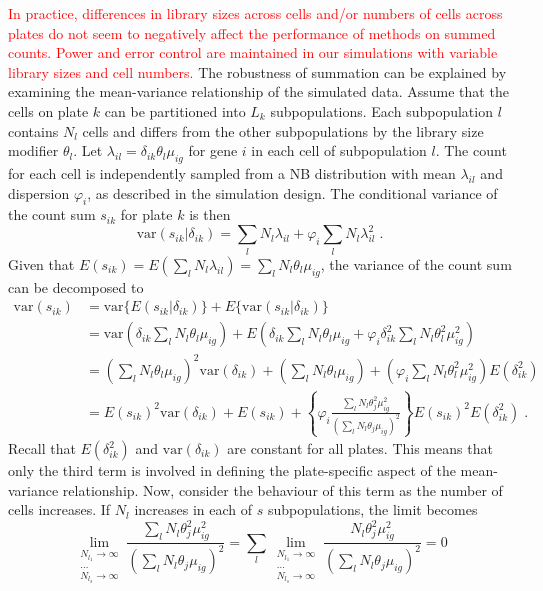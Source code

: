 \documentclass{article}
\newcommand\revised[1]{\textcolor{red}{#1}}
\begin{document}
\revised{In practice, differences in library sizes across cells and/or numbers of cells across plates do not seem to negatively affect the performance of methods on summed counts.
Power and error control are maintained in our simulations with variable library sizes and cell numbers.}
The robustness of summation can be explained by examining the mean-variance relationship of the simulated data.
Assume that the cells on plate $k$ can be partitioned into $L_k$ subpopulations.
Each subpopulation $l$ contains $N_l$ cells and differs from the other subpopulations by the library size modifier $\theta_l$.
Let $\lambda_{il} = \delta_{ik}\theta_{l}\mu_{ig}$ for gene $i$ in each cell of subpopulation $l$.
The count for each cell is independently sampled from a NB distribution with mean $\lambda_{il}$ and dispersion $\varphi_i$, as described in the simulation design.
The conditional variance of the count sum $s_{ik}$ for plate $k$ is then
\[
    \mbox{var}(s_{ik} | \delta_{ik}) = \sum_{l} N_l \lambda_{il}  + \varphi_{i} \sum_{l} N_l \lambda_{il}^2 \;.
\]
Given that $E(s_{ik}) = E(\sum_l N_l\lambda_{il}) = \sum_l N_l \theta_l \mu_{ig}$, the variance of the count sum can be decomposed to
\begin{align*}
    \mbox{var}(s_{ik}) 
    &= \mbox{var}\{E(s_{ik} | \delta_{ik} ) \} + E\{ \mbox{var}(s_{ik} | \delta_{ik}) \}\\
    &= \mbox{var}\left(\delta_{ik}\sum_l N_l \theta_{l}\mu_{ig}\right) + E\left(\delta_{ik}\sum_l  N_l\theta_l\mu_{ig}  + \varphi_{i} \delta_{ik}^2 \sum_l  N_l\theta_l^2\mu_{ig}^2\right)\\
    &= \left(\sum_l N_l \theta_{l}\mu_{ig} \right)^2 \mbox{var}(\delta_{ik}) + \left(\sum_l N_l \theta_{l}\mu_{ig}\right) + \left( \varphi_i \sum_l  N_l\theta_l^2\mu_{ig}^2 \right) E(\delta_{ik}^2) \\
    &= E(s_{ik})^2 \mbox{var}(\delta_{ik}) + E(s_{ik}) + \left\{ \varphi_i \frac{\sum_l N_l \theta_j^2\mu_{ig}^2}{ (\sum_l N_l \theta_j\mu_{ig})^2}  \right\} E(s_{ik})^2 E(\delta_{ik}^2) \;. 
\end{align*}
Recall that $E(\delta_{ik}^2)$ and $\mbox{var}(\delta_{ik})$ are constant for all plates.
This means that only the third term is involved in defining the plate-specific aspect of the mean-variance relationship.
Now, consider the behaviour of this term as the number of cells increases.
If $N_l$ increases in each of $s$ subpopulations, the limit becomes
\[
    \lim_{\substack{N_{l_1} \to \infty \\ \dots \\ N_{l_s} \to \infty}} \frac{\sum_l N_l \theta_j^2\mu_{ig}^2}{ (\sum_l N_l \theta_j\mu_{ig})^2} 
    = \sum_l \lim_{\substack{N_{l_1} \to \infty \\ \dots \\ N_{l_s} \to \infty}} \frac{N_l \theta_j^2\mu_{ig}^2}{ (\sum_l N_l \theta_j\mu_{ig})^2} 
= 0
\]
\end{document}
